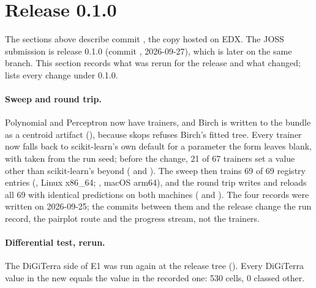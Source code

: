 \section{Release 0.1.0}
\label{sec:release}

The sections above describe commit , the copy hosted on EDX. The JOSS submission is release 0.1.0 (commit , 2026-09-27), which is later on the same branch. This section records what was rerun for the release and what changed;  lists every change under 0.1.0.

\paragraph{Sweep and round trip.} Polynomial and Perceptron now have trainers, and Birch is written to the bundle as a centroid artifact (), because skops refuses Birch's fitted tree. Every trainer now falls back to scikit-learn's own default for a parameter the form leaves blank, with  taken from the run seed; before the change, 21 of 67 trainers set a value other than scikit-learn's beyond  ( and ). The sweep then trains 69 of 69 registry entries (, Linux x86\_64; , macOS arm64), and the round trip writes and reloads all 69 with identical predictions on both machines ( and ). The four records were written on 2026-09-25; the commits between them and the release change the run record, the pairplot route and the progress stream, not the trainers.

\paragraph{Differential test, rerun.} The DiGiTerra side of E1 was run again at the release tree (). Every DiGiTerra value in the new  equals the value in the recorded one: 530 cells, 0 classed other.

